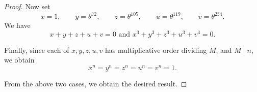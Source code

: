 \documentclass[10pt,a4paper]{amsart}
\begin{document}
\begin{proof}
Now set
\[
x=1,\qquad
y=\theta^{72},\qquad
z=\theta^{105},\qquad
u=\theta^{119},\qquad
v=\theta^{234}.
\]
We have
\[
x+y+z+u+v=0
\,\,\text{and}\,\,
x^3+y^3+z^3+u^3+v^3=0.
\]

Finally, since each of \(x,y,z,u,v\) has multiplicative order
dividing \(M\), and \(M\mid n\), we obtain
\[
x^n=y^n=z^n=u^n=v^n=1.
\]

From the above two cases, we obtain the desired result.
\end{proof}
\end{document}
